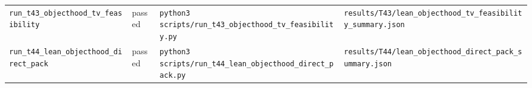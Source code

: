 {\begin{longtable}{>{\raggedright\arraybackslash}p{} >{\raggedright\arraybackslash}p{} >{\raggedright\arraybackslash}p{} >{\raggedright\arraybackslash}p{}}
\texttt{run\_t43\_objecthood\_tv\_feasibility} & passed & \texttt{python3 scripts/run\_t43\_objecthood\_tv\_feasibility.py} & \texttt{results/T43/lean\_objecthood\_tv\_feasibility\_summary.json}\\
\texttt{run\_t44\_lean\_objecthood\_direct\_pack} & passed & \texttt{python3 scripts/run\_t44\_lean\_objecthood\_direct\_pack.py} & \texttt{results/T44/lean\_objecthood\_direct\_pack\_summary.json}\\
\end{longtable}
}
